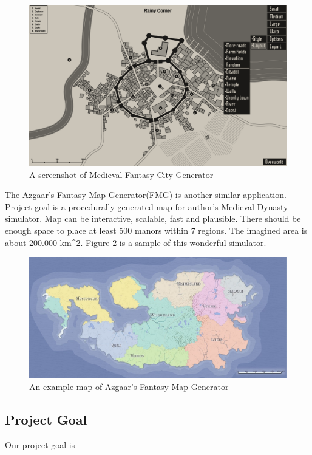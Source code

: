 \begin{figure}[htb]
\centering
\includegraphics[width=.5\textwidth]{section01/assets/screenshot_MFCG.png}
\caption[A screenshot of Medieval Fantasy City Generator]{\label{Screenshot MFCG}A screenshot of Medieval Fantasy City Generator}
\end{figure}

The Azgaar's Fantasy Map Generator(FMG) is another similar application. Project goal is a procedurally generated map for author's Medieval Dynasty simulator. Map can be interactive, scalable, fast and plausible. There should be enough space to place at least 500 manors within 7 regions. The imagined area is about 200.000 km^2. Figure \ref{Sample Map 1} is a sample of this wonderful simulator.

\begin{figure}[htb]
\centering
\includegraphics[width=.5\textwidth]{section01/assets/sample_map1.jpeg}
\caption[An example map of Azgaar's Fantasy Map Generator]{\label{Sample Map 1}An example map of Azgaar's Fantasy Map Generator}
\end{figure}

\subsection{Project Goal}
Our project goal is
